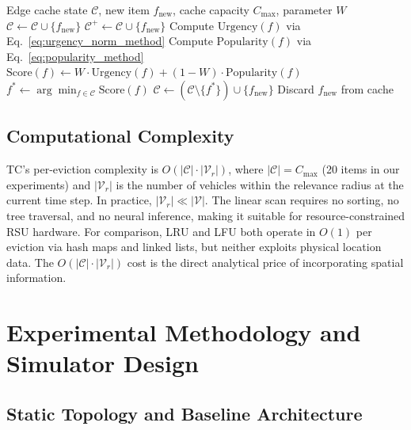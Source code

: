 \documentclass[preprint,12pt]{elsarticle}
\begin{document}
	\begin{algorithm}[t]
		\caption{TrajectoryCache Eviction Policy}
		\label{alg:tc}
		\begin{algorithmic}[1]
			\REQUIRE Edge cache state $\mathcal{C}$, new item $f_\text{new}$, cache capacity $C_\text{max}$, parameter $W$
			\STATE $\mathcal{C} \leftarrow \mathcal{C} \cup \{f_\text{new}\}$
			\RETURN
			\ENDIF
			\STATE $\mathcal{C}^+ \leftarrow \mathcal{C} \cup \{f_\text{new}\}$
			\STATE Compute $\text{Urgency}(f)$ via Eq.~\ref{eq:urgency_norm_method}
			\STATE Compute $\text{Popularity}(f)$ via Eq.~\ref{eq:popularity_method}
			\STATE $\text{Score}(f) \leftarrow W \cdot \text{Urgency}(f) + (1 - W) \cdot \text{Popularity}(f)$
			\ENDFOR
			\STATE $f^* \leftarrow \arg\min_{f \in \mathcal{C}} \text{Score}(f)$
			\STATE $\mathcal{C} \leftarrow (\mathcal{C} \setminus \{f^*\}) \cup \{f_\text{new}\}$
			\ELSE
			\STATE Discard $f_\text{new}$ from cache
			\ENDIF
		\end{algorithmic}
	\end{algorithm}
	
	\subsection{Computational Complexity}
	
	TC's per-eviction complexity is $O(|\mathcal{C}| \cdot |\mathcal{V}_r|)$, where $|\mathcal{C}| = C_\text{max}$ (20 items in our experiments) and $|\mathcal{V}_r|$ is the number of vehicles within the relevance radius at the current time step. In practice, $|\mathcal{V}_r| \ll |\mathcal{V}|$. The linear scan requires no sorting, no tree traversal, and no neural inference, making it suitable for resource-constrained RSU hardware. For comparison, LRU and LFU both operate in $O(1)$ per eviction via hash maps and linked lists, but neither exploits physical location data. The $O(|\mathcal{C}| \cdot |\mathcal{V}_r|)$ cost is the direct analytical price of incorporating spatial information.
	
	\section{Experimental Methodology and Simulator Design}
	\label{sec:setup}
	
	\subsection{Static Topology and Baseline Architecture}
	
\end{document}
